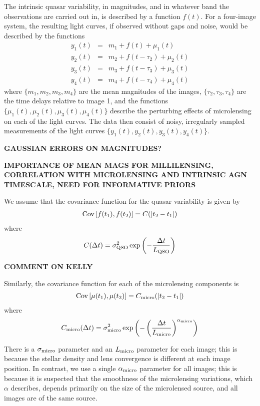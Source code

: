 \documentclass[useAMS,usenatbib, a4paper]{mn2e} \usepackage{natbib}
\begin{document}
The intrinsic quasar variability, in magnitudes, and in whatever band the
observations are carried out in, is described by a function $f(t)$. For a
four-image system, the resulting light curves, if observed without gaps and
noise, would be described by the functions
\begin{eqnarray}
y_1(t) &=& m_1 + f(t) + \mu_1(t) \\
y_2(t) &=& m_2 + f(t - \tau_2) + \mu_2(t) \\
y_3(t) &=& m_3 + f(t - \tau_3) + \mu_3(t) \\
y_4(t) &=& m_4 + f(t - \tau_4) + \mu_4(t) 
\end{eqnarray}
where $\{m_1, m_2, m_3, m_4\}$ are the mean magnitudes of the images,
$\{\tau_2, \tau_3, \tau_4\}$ are the time delays relative to image 1, and the
functions $\{\mu_1(t), \mu_2(t), \mu_3(t), \mu_4(t)\}$ describe the perturbing
effects of microlensing on each of the light curves. The data then consist of
noisy, irregularly sampled measurements of the light curves $\{y_1(t), y_2(t),
y_3(t), y_4(t)\}$.

{\bf GAUSSIAN ERRORS ON MAGNITUDES?}

{\bf IMPORTANCE OF MEAN MAGS FOR MILLILENSING, CORRELATION WITH MICROLENSING AND INTRINSIC AGN TIMESCALE, NEED FOR INFORMATIVE PRIORS}

We assume that the covariance function for the quasar variability is given by
\begin{eqnarray}
\textnormal{Cov}\left[f(t_1), f(t_2)\right] = C(|t_2 - t_1|)
\end{eqnarray}
where
\begin{eqnarray}
C(\Delta t) = \sigma_{\rm QSO}^2\exp\left(-\frac{\Delta t}{L_{\rm QSO}}\right)
\end{eqnarray}

{\bf COMMENT ON KELLY}

Similarly, the covariance function for each of the microlensing components is
\begin{eqnarray}
\textnormal{Cov}\left[\mu(t_1), \mu(t_2)\right] = C_{\rm micro}(|t_2 - t_1|)
\end{eqnarray}
where
\begin{eqnarray}
C_{\rm micro}(\Delta t) = \sigma_{\rm micro}^2\exp\left(-\left(\frac{\Delta t}{L_{\rm micro}}\right)^{\alpha_{\rm micro}}\right)
\end{eqnarray}

There is a $\sigma_{\rm micro}$  parameter and an $L_{\rm micro}$ parameter
for each image; this is because the stellar density and lens convergence is
different at each image position. In contrast, we use a single $\alpha_{\rm
micro}$   parameter for all images; this is because it is suspected that the
smoothness of the microlensing variations, which $\alpha$ describes, depends
primarily on the size of the microlensed source, and all images are of the
same source. 
\end{document}
